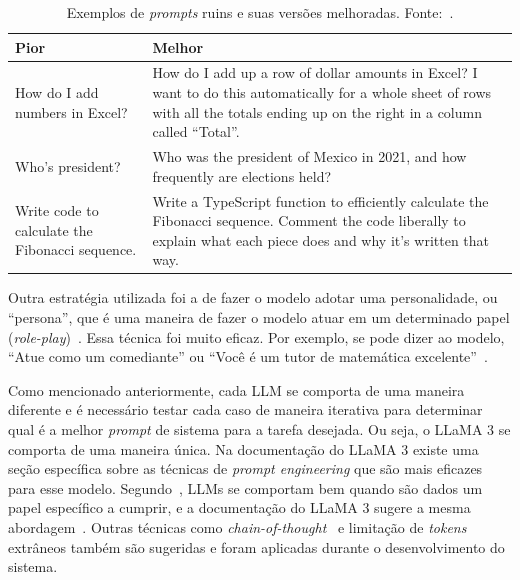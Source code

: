 \documentclass[journal]{IEEEtran}
\begin{document}
\begin{table}
    \caption{Exemplos de \textit{prompts} ruins e suas versões melhoradas. Fonte:~\cite{openaipromptengineering}.\label{tab:openaiprompts}}
    \centering
    \begin{tabularx}{\columnwidth}{XX}
        \toprule
        \textbf{Pior} & \textbf{Melhor} \\
        \midrule
        How do I add numbers in Excel?                  & How do I add up a row of dollar amounts in Excel? I want to do this
                                                          automatically for a whole sheet of rows with all the totals ending
                                                          up on the right in a column called ``Total''.\\
        \midrule
        Who's president?                                & Who was the president of Mexico in 2021, and how frequently are
                                                          elections held?\\
        \midrule
        Write code to calculate the Fibonacci sequence. & Write a TypeScript function to efficiently calculate the Fibonacci
                                                          sequence. Comment the code liberally to explain what each piece does
                                                          and why it's written that way.\\
        \bottomrule
    \end{tabularx}
\end{table}

Outra estratégia utilizada foi a de fazer o modelo adotar uma personalidade, ou ``persona'', que é uma maneira de fazer o modelo atuar em um determinado papel (\textit{role-play})~\cite{kong2023better}.
Essa técnica foi muito eficaz.
Por exemplo, se pode dizer ao modelo, ``Atue como um comediante'' ou ``Você é um tutor de matemática excelente''~\cite{openaipromptengineering}.

Como mencionado anteriormente, cada LLM se comporta de uma maneira diferente e é necessário testar cada caso de maneira iterativa para determinar qual é a melhor \textit{prompt} de sistema para a tarefa desejada.
Ou seja, o LLaMA 3 se comporta de uma maneira única.
Na documentação do LLaMA 3 existe uma seção específica sobre as técnicas de \textit{prompt engineering} que são mais eficazes para esse modelo.
Segundo~\cite{kong2023better}, LLMs se comportam bem quando são dados um papel específico a cumprir, e a documentação do LLaMA 3 sugere a mesma abordagem~\cite{llama3modelcard}.
Outras técnicas como \textit{chain-of-thought}~\cite{wei2022chain} e limitação de \textit{tokens} extrâneos também são sugeridas e foram aplicadas durante o desenvolvimento do sistema.
\end{document}
